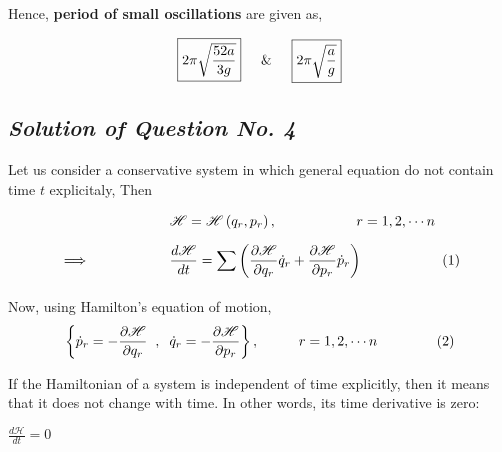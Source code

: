 \documentclass[12pt, a4paper]{article} %
\begin{document}
Hence, {\bf period of small oscillations} are given as,

\BgThispage

\begin{align*}
    \boxed{2 \pi \sqrt{\frac{52a}{3g}}}
    \hspace*{5mm} \mbox{\&}\hspace*{5mm} \boxed{2 \pi \sqrt{\frac{a}{g}}}
\end{align*}

\subsection{\slshape Solution of Question No. 4}

Let us consider a conservative system in which general equation do not contain time $t$ explicitaly, Then

\begin{equation*}
    \begin{split}
        & \mathscr{H} = \mathscr{H}\left(q_r, p_r\right), \hspace*{2cm} r = 1,2,\cdots n \\[2mm]
        \implies\hspace*{2cm} & \frac{d\mathscr{H}}{dt} = \sum_{}^{} \left(\frac{\partial \mathscr{H}}{\partial q_r}\dot{q}_r + \frac{\partial \mathscr{H}}{\partial p_r}\dot{p}_r\right) \hspace*{2cm}(1)
    \end{split}
\end{equation*}

Now, using Hamilton's equation of motion,
\begin{equation*}
    \left\{\dot{p}_r = -\frac{\partial \mathscr{H}}{\partial q_r}\hspace*{2mm}, \hspace*{2mm} \dot{q}_r = -\frac{\partial \mathscr{H}}{\partial p_r}\right\}, \hspace*{1cm} r = 1, 2, \cdots n \hspace*{1.5cm} (2)
\end{equation*}



If the Hamiltonian of a system is independent of time explicitly, then it means that it does not change with time. In other words, its time derivative is zero:

\begin{center}
    $\displaystyle \frac{d\mathscr{H}}{dt} = 0$
\end{center}
\end{document}
